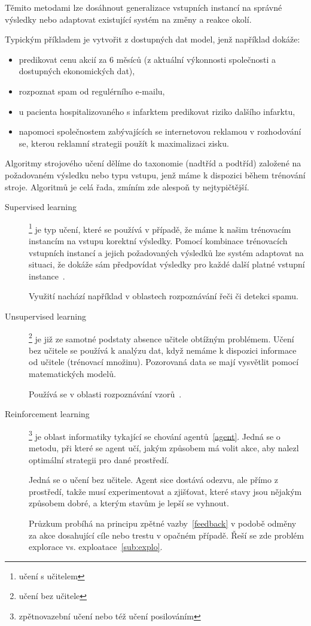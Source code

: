 \documentclass[thesis=M,czech]{FITthesis}[2014/05/07]
\begin{document}
Těmito metodami lze dosáhnout generalizace vstupních instancí na správné výsledky nebo adaptovat existující systém na změny a reakce okolí. 

Typickým příkladem je vytvořit z dostupných dat model, jenž například dokáže:

\begin{itemize}
  \item predikovat cenu akcií za 6 měsíců (z aktuální výkonnosti společnosti a dostupných ekonomických dat),
  \item rozpoznat spam od regulérního e-mailu,
  \item u pacienta hospitalizovaného s infarktem predikovat riziko dalšího infarktu,
  \item napomoci společnostem zabývajících se internetovou reklamou v rozhodování se, kterou reklamní strategii použít k maximalizaci zisku.
\end{itemize}

Algoritmy strojového učení dělíme do taxonomie (nadtříd a podtříd) založené na požadovaném výsledku nebo typu vstupu, jenž máme k dispozici během trénování stroje. Algoritmů je celá řada, zmíním zde alespoň ty nejtypičtější. 

\begin{description}
  \item[Supervised learning]\footnote{učení s učitelem} je typ učení, které se používá v případě, že máme k našim trénovacím instancím na vstupu korektní výsledky. Pomocí kombinace trénovacích vstupních instancí a jejich požadovaných výsledků lze systém adaptovat na situaci, že dokáže sám předpovídat výsledky pro každé další platné vstupní instance~\cite{aihorizon}.
  
  Využití nachází například v oblastech rozpoznávání řeči či detekci spamu.
  \item[Unsupervised learning]\footnote{učení bez učitele} je již ze samotné podstaty absence učitele obtížným problémem. Učení bez učitele se používá k analýzu dat, když nemáme k dispozici informace od učitele (trénovací množinu). Pozorovaná data se mají vysvětlit pomocí matematických modelů.
  
  Používá se v oblasti rozpoznávání vzorů~\cite{hlavac}.
  \item[Reinforcement learning]\footnote{zpětnovazební učení nebo též učení posilováním} je oblast informatiky tykající se chování agentů~\ref{agent}. Jedná se o metodu, při které se agent učí, jakým způsobem má volit akce, aby nalezl optimální strategii pro dané prostředí.
  
  Jedná se o učení bez učitele. Agent sice dostává odezvu, ale přímo z prostředí, takže musí experimentovat a zjišťovat, které stavy jsou nějakým způsobem dobré, a kterým stavům je lepší se vyhnout.
  
  Průzkum probíhá na principu zpětné vazby~\ref{feedback} v podobě odměny za akce dosahující cíle nebo trestu v opačném případě. Řeší se zde problém explorace vs. exploatace~\ref{sub:explo}. 
\end{description}
\end{document}
